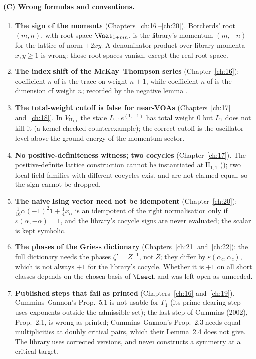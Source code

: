 \paragraph{(C) Wrong formulas and conventions.}
\begin{enumerate}
\item \textbf{The sign of the momenta} (Chapters~\ref{ch:16}--\ref{ch:20}). Borcherds' root $(m,n)$, with root space
  $\Vnat_{1+mn}$, is the library's momentum $(m,-n)$ for the lattice of norm $+2xy$. A denominator product over library
  momenta $x,y\ge1$ is wrong: those root spaces vanish, except the real root space.
\item \textbf{The index shift of the McKay--Thompson series} (Chapter~\ref{ch:16}): coefficient $n$ of
   is the trace on weight $n+1$, while coefficient $n$ of  is the dimension of weight
  $n$; recorded by the negative lemma .
\item \textbf{The total-weight cutoff is false for near-VOAs} (Chapters~\ref{ch:17} and~\ref{ch:18}). In
  $V_{\mathrm{II}_{1,1}}$ the state $L_{-1}e^{(1,-1)}$ has total weight $0$ but $L_1$ does not kill it (a kernel-checked
  counterexample); the correct cutoff is the oscillator level above the ground energy of the momentum sector.
\item \textbf{No positive-definiteness witness; two cocycles} (Chapter~\ref{ch:17}). The positive-definite lattice
  construction cannot be instantiated at $\mathrm{II}_{1,1}$ (); two local field families with
  different cocycles exist and are not claimed equal, so the sign  cannot be dropped.
\item \textbf{The naive Ising vector need not be idempotent} (Chapter~\ref{ch:20}): $\tfrac1{16}\alpha(-1)^2\mathbf
  1+\tfrac14x_\alpha$ is an idempotent of the right normalisation only if $\varepsilon(\alpha,-\alpha)=1$, and the
  library's cocycle signs are never evaluated; the scalar is kept symbolic.
\item \textbf{The phases of the Griess dictionary} (Chapters~\ref{ch:21} and~\ref{ch:22}): the full dictionary needs the
  phases $\zeta'=Z^{-1}$, not $Z$; they differ by $\varepsilon(\alpha_c,\alpha_c)$, which is not always $+1$ for the
  library's cocycle. Whether it is $+1$ on all short classes depends on the chosen basis of $\Leech$ and was left open as
  unneeded.
\item \textbf{Published steps that fail as printed} (Chapters~\ref{ch:16} and~\ref{ch:19}). Cummins--Gannon's Prop.~5.1 is
  not usable for $\Gamma_1$ (its prime-clearing step uses exponents outside the admissible set); the last step of Cummins
  (2002), Prop.~2.1, is wrong as printed; Cummins--Gannon's Prop.~2.3 needs equal multiplicities at doubly critical pairs,
  which their Lemma~2.4 does not give. The library uses corrected versions, and never constructs a symmetry at a critical
  target.
\end{enumerate}

